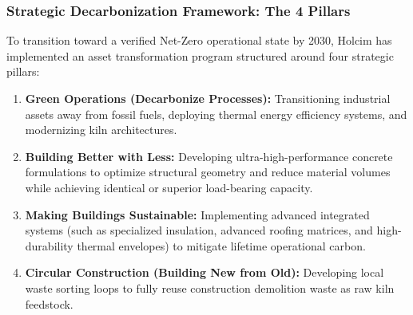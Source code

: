 \subsubsection{Strategic Decarbonization Framework: The 4 Pillars}
To transition toward a verified Net-Zero operational state by 2030, Holcim has implemented an asset transformation program structured around four strategic pillars:
\begin{enumerate}
    \item \textbf{Green Operations (Decarbonize Processes):} Transitioning industrial assets away from fossil fuels, deploying thermal energy efficiency systems, and modernizing kiln architectures.
    \item \textbf{Building Better with Less:} Developing ultra-high-performance concrete formulations to optimize structural geometry and reduce material volumes while achieving identical or superior load-bearing capacity.
    \item \textbf{Making Buildings Sustainable:} Implementing advanced integrated systems (such as specialized insulation, advanced roofing matrices, and high-durability thermal envelopes) to mitigate lifetime operational carbon.
    \item \textbf{Circular Construction (Building New from Old):} Developing local waste sorting loops to fully reuse construction demolition waste as raw kiln feedstock.
\end{enumerate}

